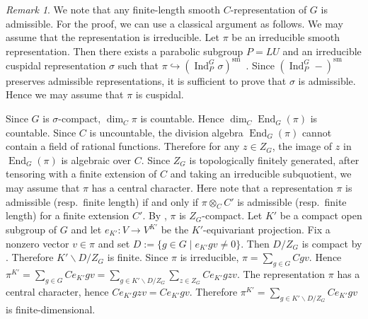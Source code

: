 \documentclass[a4paper]{amsart}
\numberwithin{equation}{section}
\theoremstyle{remark}
\newtheorem{remark}[thm]{Remark}
\theoremstyle{definition}
\DeclareMathOperator{\Ind}{Ind}
\DeclareMathOperator{\End}{End}
\newcommand{\sm}{\mathrm{sm}}
\begin{document}
\begin{remark}
We note that any finite-length smooth $C$-representation of $G$ is admissible.
For the proof, we can use a classical argument as follows.
We may assume that the representation is irreducible.
Let $\pi$ be an irreducible smooth representation.
Then there exists a parabolic subgroup $P = LU$ and an irreducible cuspidal representation $\sigma$ such that $\pi\hookrightarrow (\Ind_{P}^{G}\sigma)^\sm$~\cite[II.2.4]{MR1395151}.
Since $(\Ind_{P}^{G} -)^\sm$ preserves admissible representations, it is sufficient to prove that $\sigma$ is admissible.
Hence we may assume that $\pi$ is cuspidal.

Since $G$ is $\sigma$-compact, $\dim_C \pi$ is countable.
Hence $\dim_C \End_{G}(\pi)$ is countable.
Since $C$ is uncountable, the division algebra $\End_{G}(\pi)$ cannot contain a field of rational functions.
Therefore for any $z\in Z_{G}$, the image of $z$ in $\End_{G}(\pi)$ is algebraic over $C$.
Since $Z_{G}$ is topologically finitely generated, after tensoring with a finite extension of $C$ and taking an irreducible subquotient, we may assume that $\pi$ has a central character.
Here note that a representation $\pi$ is admissible (resp.\ finite length) if and only if $\pi\otimes_{C}C'$ is admissible (resp.\ finite length) for a finite extension $C'$.
By \cite[II.2.7]{MR1395151}, $\pi$ is $Z_{G}$-compact.
Let $K'$ be a compact open subgroup of $G$ and let $e_{K'}\colon V\to V^{K'}$ be the $K'$-equivariant projection.
Fix a nonzero vector $v\in \pi$ and set $D := \{g\in G\mid e_{K'}gv\ne 0\}$.
Then $D/Z_{G}$ is compact by \cite[I.7.3]{MR1395151}.
Therefore $K'\backslash D/Z_{G}$ is finite.
Since $\pi$ is irreducible, $\pi = \sum_{g\in G}Cgv$.
Hence $\pi^{K'} = \sum_{g\in G}Ce_{K'}gv = \sum_{g\in K'\backslash D/Z_{G}}\sum_{z\in Z_{G}}Ce_{K'}gzv$.
The representation $\pi$ has a central character, hence $Ce_{K'}gzv = Ce_{K'}gv$.
Therefore $\pi^{K'} = \sum_{g\in K'\backslash D/Z_{G}}Ce_{K'}gv$ is finite-dimensional.
\end{remark}
\end{document}
